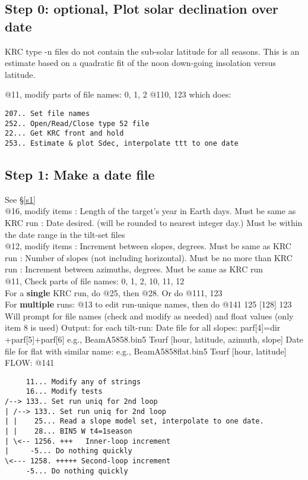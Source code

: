 \documentclass{article}
\begin{document}
\subsection{Step 0: optional, Plot solar declination over date}

KRC type -n files do not contain the sub-solar latitude for all seasons. 
This is an estimate based on a quadratic fit of the noon down-going insolation versus latitude.

@11, modify parts of file names: 0, 1, 2
\qi @110, 123 which does:
\vspace{-3.mm} 
\begin{verbatim}
207.. Set file names
252.. Open/Read/Close type 52 file
22... Get KRC front and hold
253.. Estimate & plot Sdec, interpolate ttt to one date
\end{verbatim}

\subsection{Step 1: Make a date file}
See \S \ref{s1} 
\\ @16, modify items 
: Length of the target's year in Earth days. Must be same as KRC run
: Date desired. (will be rounded to nearest integer day.) 
\qii Must be within the date range in the tilt-set files 
\\ @12,  modify items
: Increment between slopes, degrees. Must be same as KRC run
: Number of slopes (not including horizontal). Must be no more than KRC run 
: Increment between azimuths, degrees. Must be same as KRC run
\\ @11, Check parts of file names: 0, 1, 2, 10, 11, 12
\\ For a \textbf{single} KRC run, do @25, then @28. Or do @111, 123
\\ For \textbf{multiple} runs: @13 to edit run-unique names, then do @141 125 [128] 123
\qii  Will prompt for file names (check and modify as needed) and float values (only item 8 is used)
\qi Output: for each tilt-run: 
\qii Date file for all slopes: parf[4]=dir +parf[5]+parf[6] e.g., BeamA5858.bin5
\qiii Tsurf [hour, latitude, azimuth, slope]
\qii Date file for flat with similar name: e.g., BeamA5858flat.bin5
\qiii Tsurf [hour, latitude]
\\ FLOW: @141
\vspace{-3.mm} 
\begin{verbatim}
     11... Modify any of strings
     16... Modify tests
/--> 133.. Set run uniq for 2nd loop
| /--> 133.. Set run uniq for 2nd loop
| |    25... Read a slope model set, interpolate to one date.
| |    28... BIN5 W t4=1season
| \<-- 1256. +++   Inner-loop increment
|     -5... Do nothing quickly
\<--- 1258. +++++ Second-loop increment
     -5... Do nothing quickly
\end{verbatim}  
\end{document}
